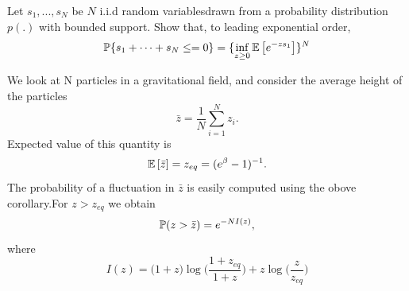 \documentclass[letterpaper,english,12pt]{article}
\begin{document}
 \begin{exmp}
 	Let $s_1,...,s_N$ be $N$ i.i.d random variablesdrawn from a probability distribution $p(.)$ with bounded support. Show that, to leading exponential order, 
   \begin{equation}
       \P \{s_1 + \dots + s_N \leq  = 0\} = \{ \inf_{z\geq 0} \E {e^{-zs_1}}  \}^N
   \end{equation}
     
 \end{exmp}
 
 \begin{exmp}
   We look at N particles in a gravitational field, and consider the average height of the particles 
   \begin{equation}
       \bar{z}= \dfrac{1}{N}\sum_{i=1}^{N}z_i.
    \end{equation}
     Expected value of this quantity  is 
       \begin{equation}
           \E{\bar{z}}= z_{eq}= (e^\beta -1)^{-1}.
           \end{equation}
           The probability of a fluctuation in $\bar{z}$ is easily computed using the obove corollary.For $z>z_{eq}$ we obtain 
           \begin{equation}
               \P(z>\bar{z}) = e^{-NI(z)},
           \end{equation}
           where 
           \begin{equation}
               I(z) = \big(1+z\big)\log \big( \dfrac{1+z_{eq}}{1+z}\big) + z\log{\big(\dfrac{z}{z_{eq}}\big)}
           \end{equation}
           
       
   
 \end{exmp}
\end{document}
